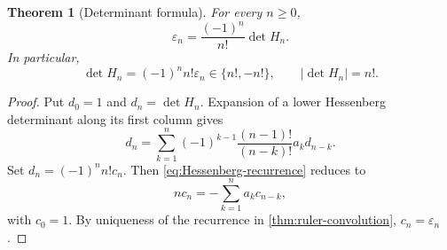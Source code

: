 \documentclass[11pt,oneside]{article}
\numberwithin{equation}{section}
\newtheorem{theorem}{Theorem}[section]
\theoremstyle{definition}
\theoremstyle{remark}
\newcommand{\eps}{\varepsilon}
\begin{document}
\begin{theorem}[Determinant formula]
\label{thm:Hessenberg-determinant}
For every \(n\ge0\),
\begin{equation}
  \boxed{
  \eps_n=\frac{(-1)^n}{n!}\det H_n.}
  \label{eq:Hessenberg-determinant}
\end{equation}
In particular,
\begin{equation}
  \det H_n=(-1)^n n!\eps_n\in\{n!,-n!\},
  \qquad
  |\det H_n|=n!.
  \label{eq:Hessenberg-factorial}
\end{equation}
\end{theorem}

\begin{proof}
Put \(d_0=1\) and \(d_n=\det H_n\).  Expansion of a lower Hessenberg
determinant along its first column gives
\begin{equation}
 d_n=\sum_{k=1}^{n}(-1)^{k-1}
     \frac{(n-1)!}{(n-k)!}a_kd_{n-k}.
 \label{eq:Hessenberg-recurrence}
\end{equation}
Set \(d_n=(-1)^nn!c_n\).  Then \eqref{eq:Hessenberg-recurrence} reduces to
\[
 nc_n=-\sum_{k=1}^{n}a_kc_{n-k},
 \]
with \(c_0=1\).  By uniqueness of the recurrence in
\cref{thm:ruler-convolution}, \(c_n=\eps_n\).
\end{proof}
\end{document}
